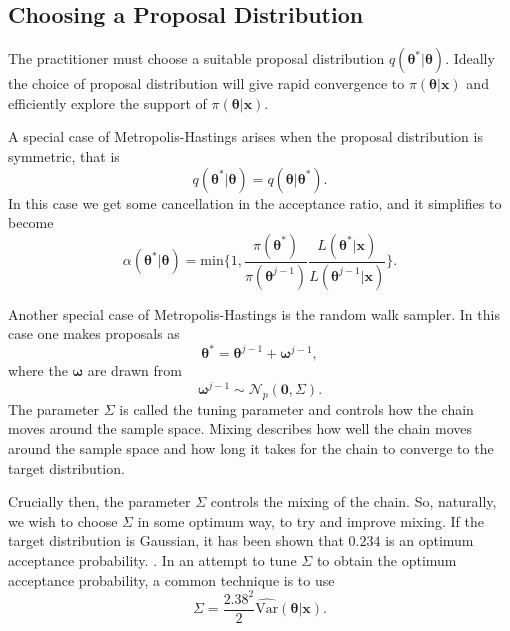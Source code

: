 \subsection*{Choosing a Proposal Distribution}
\label{sssec:proposal_distribution}
The practitioner must choose a suitable proposal distribution $q(\bm{\theta}^*|\bm{\theta})$. Ideally the choice of proposal distribution will give rapid convergence to $\pi(\bm{\theta}|\bm{x})$ and efficiently explore the support of $\pi(\bm{\theta}|\bm{x})$.

A special case of Metropolis-Hastings arises when the proposal distribution is symmetric, that is
\begin{equation*}
	q(\bm{\theta}^*|\bm{\theta}) = q(\bm{\theta}|\bm{\theta}^*).
\end{equation*}
In this case we get some cancellation in the acceptance ratio, and it simplifies to become 
\begin{equation*}
\alpha({\bm{\theta}}^*|\bm{\theta}) = \text{min}\bigg\{ 1, \frac{\pi({\bm{\theta}}^*)}{\pi({\bm{\theta}}^{j-1})} \frac{L(\bm{\theta}^*|\bm{x})}{L({\bm{\theta}}^{j-1}|\bm{x})} \bigg\}.
\end{equation*}

Another special case of Metropolis-Hastings is the random walk sampler. In this case one makes proposals as
\begin{equation*}
	\bm{\theta}^* = \bm{\theta}^{j-1} + \bm{\omega}^{j-1},
\end{equation*}
where the $\bm{\omega}$ are drawn from
\begin{equation*}
	\bm{\omega}^{j-1} \sim \mathcal{N}_p(\bm{0}, \Sigma).
\end{equation*}
The parameter $\Sigma$ is called the tuning parameter and controls how the chain moves around the sample space. Mixing describes how well the chain moves around the sample space and how long it takes for the chain to converge to the target distribution.

Crucially then, the parameter $\Sigma$ controls the mixing of the chain. So, naturally, we wish to choose $\Sigma$ in some optimum way, to try and improve mixing. If the target distribution is Gaussian, it has been shown that $0.234$ is an optimum acceptance probability. \citep{roberts01}. In an attempt to tune $\Sigma$ to obtain the optimum acceptance probability, a common technique is to use 
\begin{equation*}
	\Sigma = \frac{2.38^2}{2} \widehat{\text{Var}}(\bm{\theta}|\bm{x}).
\end{equation*}

